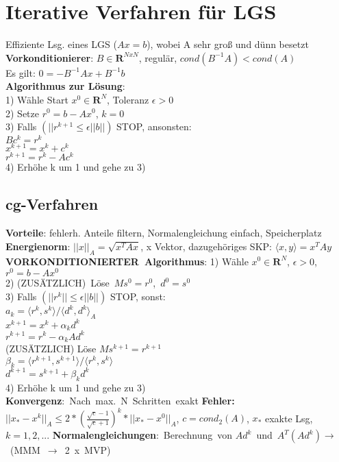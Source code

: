 \section{Iterative Verfahren für LGS}
Effiziente Lsg. eines LGS ($Ax = b$), wobei A sehr groß und dünn besetzt\\
\textbf{Vorkonditionierer}: $B \in \mathbf{R}^{NxN}$, regulär, $cond(B^{-1}A) < cond(A)$\\
Es gilt: $0 = -B^{-1}Ax + B^{-1}b$\\
\textbf{Algorithmus zur Lösung}:\\
1) Wähle Start $x^0 \in \mathbf{R}^N$, Toleranz $\epsilon > 0$\\
2) Setze $r^0 = b - Ax^0$, $k = 0$\\
3) Falls $(||r^{k+1} \leq \epsilon||b||)$ STOP, ansonsten:\\
\hspace*{5mm}$Bc^k = r^k$\\
\hspace*{5mm}$x^{k+1} = x^k + c^k$\\
\hspace*{5mm}$r^{k+1} = r^k - Ac^k$\\
4) Erhöhe k um 1 und gehe zu 3)


\subsection{cg-Verfahren}
\textbf{Vorteile}: fehlerh. Anteile filtern, Normalengleichung einfach, Speicherplatz\\
\textbf{Energienorm}: $||x||_A = \sqrt{x^TAx}$, x Vektor, dazugehöriges SKP: $\langle x , y \rangle = x^TAy$\\
\mbox{\textbf{VORKONDITIONIERTER Algorithmus}:}
1) Wähle $x^0 \in \mathbf{R}^N$, $\epsilon > 0$, $r^0 = b - Ax^0$\\
2) \mbox{(ZUSÄTZLICH) Löse $Ms^0 = r^0$, $d^0 = s^0$}\\
3) Falls $(||r^k|| \leq \epsilon||b||)$ STOP, sonst:\\
\hspace*{5mm}$a_k = \langle r^k, s^k\rangle / \langle d^k, d^k\rangle_A$\\
\hspace*{5mm}$x^{k+1} = x^k + \alpha_kd^k$\\
\hspace*{5mm}$r^{k+1} = r^k - \alpha_kAd^k$\\
\hspace*{5mm}(ZUSÄTZLICH) Löse $Ms^{k+1} = r^{k+1}$\\
\hspace*{5mm}$\beta_k = \langle r^{k+1}, s^{k+1}\rangle / \langle r^k, s^k\rangle $\\
\hspace*{5mm}$d^{k+1} = s^{k+1} + \beta_kd^k$\\
4) Erhöhe k um 1 und gehe zu 3)\\
\mbox{\textbf{Konvergenz}: Nach max. N Schritten exakt}
\textbf{Fehler:} $||x_{*} - x^k||_A \leq 2*(\frac{\sqrt{c} - 1}{\sqrt{c} + 1})^k *||x_{*} - x^0||_A$, $c = cond_2(A)$, $x_{*}$ exakte Lsg, $k = 1,2, ...$
\mbox{\textbf{Normalengleichungen}: Berechnung von} \mbox{$Ad^k$ und $A^T(Ad^k) \rightarrow$ (MMM $\rightarrow$ 2 x MVP)}
